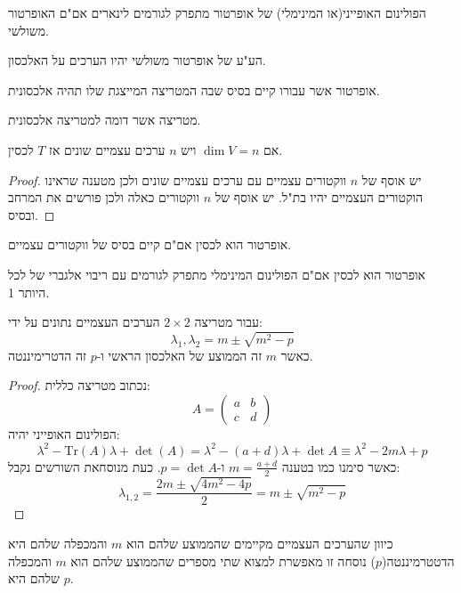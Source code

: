 \documentclass{tstextbook}
\begin{document}
\begin{proposition}
הפולינום האופייני(או המינימלי) של אופרטור מתפרק לגורמים לינארים אם"ם האופרטור משולשי.

\end{proposition}
\begin{proposition}
הע"ע של אופרטור משולשי יהיו הערכים על האלכסון.

\end{proposition}
\begin{definition}
אופרטור אשר עבורו קיים בסיס שבה המטריצה המייצגת שלו תהיה אלכסונית.

\end{definition}
\begin{definition}
מטריצה אשר דומה למטריצה אלכסונית.

\end{definition}
\begin{proposition}
אם \(\dim V=n\) ויש \(n\) ערכים עצמיים שונים אז \(T\) לכסין.

\end{proposition}
\begin{proof}
יש אוסף של \(n\) ווקטורים עצמיים עם ערכים עצמיים שונים ולכן מטענה שראינו הוקטורים העצמיים יהיו בת"ל. יש אוסף של \(n\) ווקטורים כאלה ולכן פורשים את המרחב ובסיס.

\end{proof}
\begin{proposition}
אופרטור הוא לכסין אם"ם קיים בסיס של ווקטורים עצמיים.

\end{proposition}
\begin{proposition}
אופרטור הוא לכסין אם"ם הפולינום המינימלי מתפרק לגורמים עם ריבוי אלגברי של לכל היותר 1.

\end{proposition}
\begin{proposition}
עבור מטריצה \(2\times 2\) הערכים העצמיים נתונים על ידי:
$$\lambda_{1},\lambda_{2}=m\pm \sqrt{ m^{2}-p }$$
כאשר \(m\) זה הממוצע של האלכסון הראשי ו-\(p\) זה הדטרימיננטה.

\end{proposition}
\begin{proof}
נכתוב מטריצה כללית:
$$A=\begin{pmatrix}a & b \\c & d
\end{pmatrix}$$
הפולינום האופייני יהיה:
$$\lambda^{2}-\mathrm{Tr}(A)\lambda+\det(A)=\lambda^{2}-(a+d)\lambda+\det A\equiv \lambda^{2}-2m\lambda+p$$
כאשר סימנו כמו בטענה \(m=\frac{a+d}{2}\) ו-\(p=\det A\). כעת מנוסחאת השורשים נקבל:
$$\lambda_{1,2}=\frac{2m\pm\sqrt{ 4 m^{2}-4p}}{2}=m\pm \sqrt{ m^{2}-p }$$

\end{proof}
\begin{corollary}
כיוון שהערכים העצמיים מקיימים שהממוצע שלהם הוא \(m\) והמכפלה שלהם היא הדטטרמיננטה(\(p\)) נוסחה זו מאפשרת למצוא שתי מספרים שהממוצע שלהם הוא \(m\) והמכפלה שלהם היא \(p\).

\end{corollary}
\end{document}
